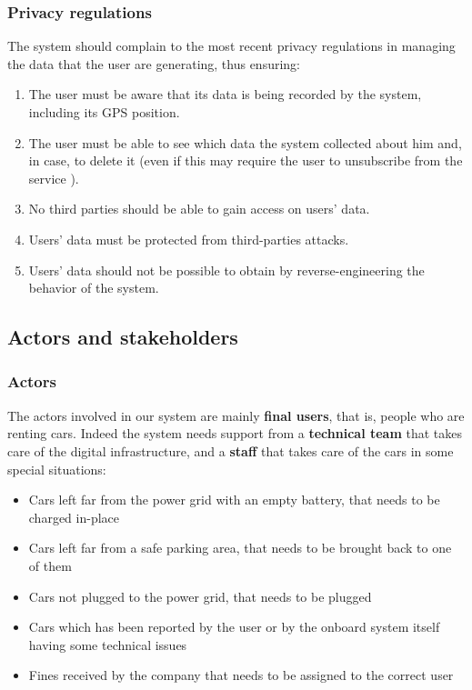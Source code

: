 \documentclass[11pt]{article} %
\begin{document}
	\subsubsection{Privacy regulations}
The system should complain to the most recent privacy regulations in managing the data that the user are generating, thus ensuring:
\begin{enumerate}
	\item The user must be aware that its data is being recorded by the system, including its GPS position.
	\item The user must be able to see which data the system collected about him and, in case, to delete it (even if this may require the user to unsubscribe from the service
).
	\item No third parties should be able to gain access on users' data.
	\item Users' data must be protected from third-parties attacks.
	\item Users' data should not be possible to obtain by reverse-engineering the behavior of the system.
\end{enumerate}

\subsection{Actors and stakeholders}

\subsubsection{Actors}
The actors involved in our system are mainly \textbf{final users}, that is, people who are renting cars. Indeed the system needs support from a \textbf{technical team} that takes care of the digital infrastructure, and a \textbf{staff} that takes care of the cars in some special situations:
\begin{itemize} 
	\item Cars left far from the power grid with an empty battery, that needs to be charged in-place
	\item Cars left far from a safe parking area, that needs to be brought back to one of them
	\item Cars not plugged to the power grid, that needs to be plugged
	\item Cars which has been reported by the user or by the onboard system itself having some technical issues
	\item Fines received by the company that needs to be assigned to the correct user
\end{itemize}
\end{document}
